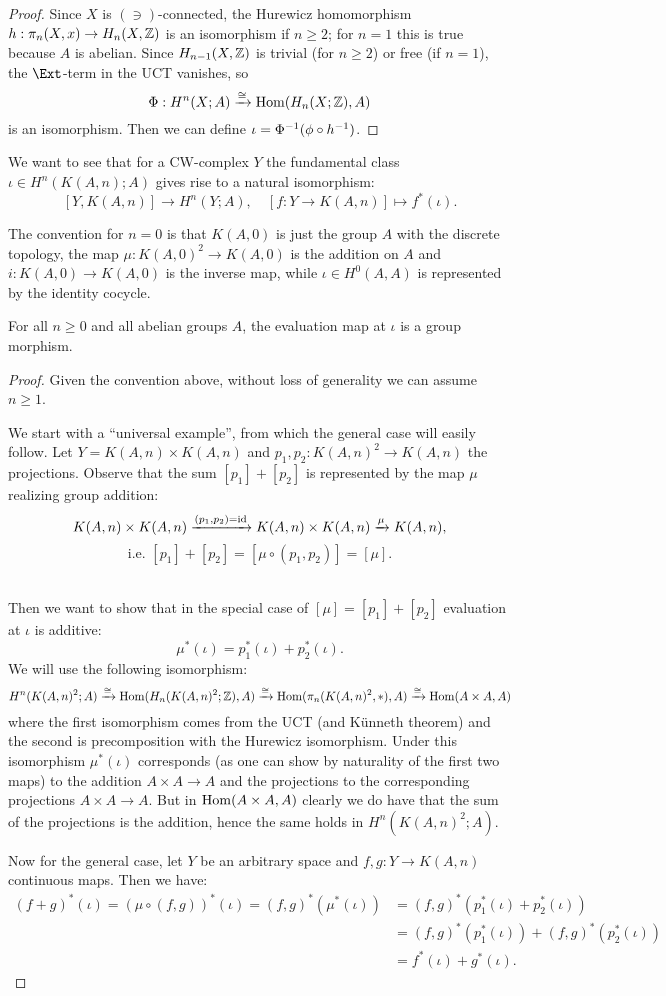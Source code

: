 \begin{proof}
Since $X$ is $(\ni)$-connected, the Hurewicz homomorphism $h:\pi_n(X,x)\to H_n(X,{\mathbb Z})$ is an isomorphism if $n\ge2$; for $n=1$ this is true because $A$ is abelian. Since $H_{n-1}(X,{\mathbb Z})$ is trivial (for $n\ge2$) or free (if $n=1$), the $\Ext$-term in the UCT vanishes, so
\[\Phi:H^n(X;A)\xrightarrow{\cong}\operatorname{Hom}(H_n(X;{\mathbb Z}),A)\]
is an isomorphism. Then we can define $\iota=\Phi^\inv(\phi\circ h^\inv)$.
\end{proof}

We want to see that for a CW-complex $Y$ the fundamental class $\iota\in H^n(K(A,n);A)$ gives rise to a natural isomorphism:
\[
[Y,K(A,n)]\to H^n(Y;A),\quad [f:Y\to K(A,n)]\mapsto f^*(\iota).
\]

The convention for $n=0$ is that $K(A,0)$ is just the group $A$ with the discrete topology, the map $\mu:K(A,0)^2\to K(A,0)$ is the addition on $A$ and $i: K(A,0)\to K(A,0)$ is the inverse map, while $\iota\in H^0(A,A)$ is represented by the identity cocycle.

\begin{theorem}
For all $n\ge0$ and all abelian groups $A$, the evaluation map at $\iota$ is a group morphism.
\end{theorem}

\begin{proof}
Given the convention above, without loss of generality we can assume $n\ge1$.

We start with a \enquote{universal example}, from which the general case will easily follow. Let $Y=K(A,n)\times K(A,n)$ and $p_1,p_2:K(A,n)^2\to K(A,n)$ the projections. Observe that the sum $[p_1]+[p_2]$ is represented by the map $\mu$ realizing group addition:
\[
K(A,n)\times K(A,n)\xrightarrow{(p_1,p_2)=\operatorname{id}}K(A,n)\times K(A,n)\xrightarrow{\mu}K(A,n),\]
\[\text{i.e. } [p_1]+[p_2]=[\mu\circ(p_1,p_2)]=[\mu].
\]\ 

Then we want to show that in the special case of $[\mu]=[p_1]+[p_2]$ evaluation at $\iota$ is additive:
\[\mu^*(\iota)=p_1^*(\iota)+p_2^*(\iota).\]
We will use the following isomorphism:
{\small
\[ H^n(K(A,n)^2;A)\xrightarrow{\cong}\operatorname{Hom}(H_n(K(A,n)^2;{\mathbb Z}),A)\xrightarrow{\cong}\operatorname{Hom}(\pi_n(K(A,n)^2,*),A)\xrightarrow{\cong}\operatorname{Hom}(A\times A,A)\]}where the first isomorphism comes from the UCT (and K\"unneth theorem) and the second is precomposition with the Hurewicz isomorphism. Under this isomorphism $\mu^*(\iota)$ corresponds (as one can show by naturality of the first two maps) to the addition $A\times A\to A$ and the projections to the corresponding projections $A\times A\to A$. But in $\operatorname{Hom}(A\times A,A)$ clearly we do have that the sum of the projections is the addition, hence the same holds in $H^n(K(A,n)^2;A)$.

Now for the general case, let $Y$ be an arbitrary space and $f,g:Y\to K(A,n)$ continuous maps. Then we have:
\begin{align*}
(f+g)^*(\iota)=(\mu\circ(f,g))^*(\iota)=(f,g)^*(\mu^*(\iota))&=(f,g)^*(p_1^*(\iota)+p_2^*(\iota))\\
&=(f,g)^*(p_1^*(\iota))+(f,g)^*(p_2^*(\iota))\\
&=f^*(\iota)+g^*(\iota).
\end{align*}
\end{proof}

